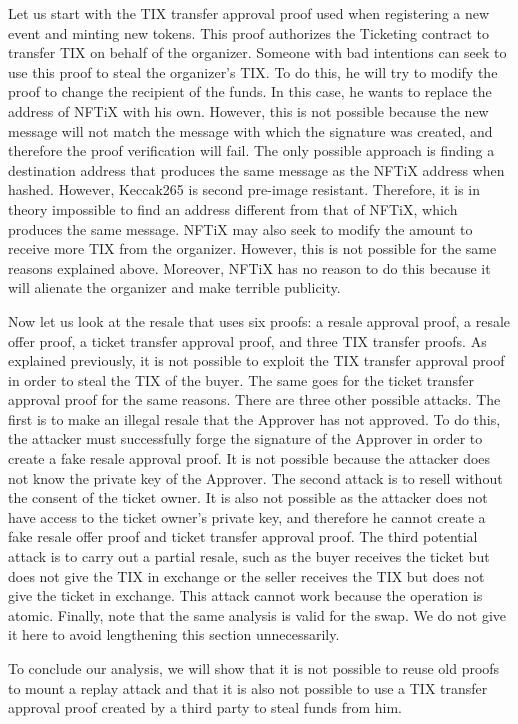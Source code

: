 \documentclass[a4paper,11pt,oneside]{report}
\begin{document}
Let us start with the TIX transfer approval proof used when registering a new event and minting new tokens. This proof authorizes the Ticketing contract to transfer TIX on behalf of the organizer. Someone with bad intentions can seek to use this proof to steal the organizer's TIX. To do this, he will try to modify the proof to change the recipient of the funds. In this case, he wants to replace the address of NFTiX with his own. However, this is not possible because the new message will not match the message with which the signature was created, and therefore the proof verification will fail. The only possible approach is finding a destination address that produces the same message as the NFTiX address when hashed. However, Keccak265 is second pre-image resistant. Therefore, it is in theory impossible to find an address different from that of NFTiX, which produces the same message. NFTiX may also seek to modify the amount to receive more TIX from the organizer. However, this is not possible for the same reasons explained above. Moreover, NFTiX has no reason to do this because it will alienate the organizer and make terrible publicity.

Now let us look at the resale that uses six proofs: a resale approval proof, a resale offer proof, a ticket transfer approval proof, and three TIX transfer proofs. As explained previously, it is not possible to exploit the TIX transfer approval proof in order to steal the TIX of the buyer. The same goes for the ticket transfer approval proof for the same reasons. There are three other possible attacks. The first is to make an illegal resale that the Approver has not approved. To do this, the attacker must successfully forge the signature of the Approver in order to create a fake resale approval proof. It is not possible because the attacker does not know the private key of the Approver. The second attack is to resell without the consent of the ticket owner. It is also not possible as the attacker does not have access to the ticket owner's private key, and therefore he cannot create a fake resale offer proof and ticket transfer approval proof. The third potential attack is to carry out a partial resale, such as the buyer receives the ticket but does not give the TIX in exchange or the seller receives the TIX but does not give the ticket in exchange. This attack cannot work because the operation is atomic. Finally, note that the same analysis is valid for the swap. We do not give it here to avoid lengthening this section unnecessarily.

To conclude our analysis, we will show that it is not possible to reuse old proofs to mount a replay attack and that it is also not possible to use a TIX transfer approval proof created by a third party to steal funds from him.
\end{document}
